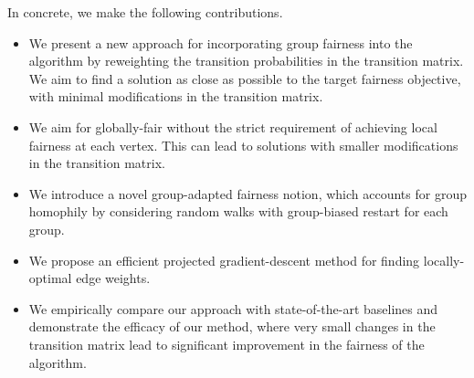 \documentclass[sigconf, anonymous, review]{acmart}
\begin{document}

\vspace{1mm}
In concrete, we make the following contributions.

\begin{itemize}[leftmargin=*]
\item 
We present a new approach for incorporating group fairness into the \pagerank algorithm 
by re\-weighting the transition probabilities in the transition matrix. 
We aim to find a solution as close as possible to the target fairness objective, 
with minimal modifications in the transition matrix.
\item 
We aim for globally-fair \pagerank without the strict requirement of achieving 
local fairness at each vertex.
This can lead to solutions with smaller modifications in the transition matrix.
\item 
We introduce a novel group-adapted fairness notion, 
which accounts for group homophily by considering random walks with group-biased restart for each group.
\item 
We propose an efficient projected gradient-descent method for finding locally-optimal edge weights.
\item 
We empirically compare our approach with state-of-the-art baselines and demonstrate the efficacy of our method, 
where very small changes in the transition matrix lead to significant improvement in the fairness of the \pagerank algorithm.
\end{itemize}

\end{document}
